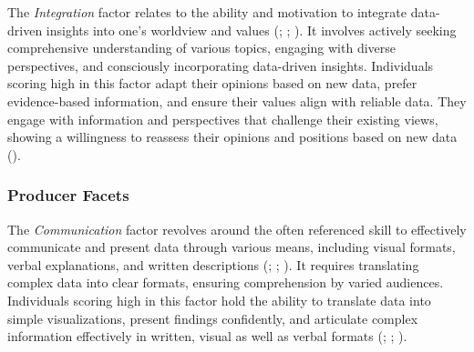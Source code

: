 \documentclass[
  12pt,
  a4paper,
  twoside]{article}
\begin{document}
The \emph{Integration} factor relates to the ability and motivation to integrate data-driven insights into one's worldview and values (; ; ). It involves actively seeking comprehensive understanding of various topics, engaging with diverse perspectives, and consciously incorporating data-driven insights. Individuals scoring high in this factor adapt their opinions based on new data, prefer evidence-based information, and ensure their values align with reliable data. They engage with information and perspectives that challenge their existing views, showing a willingness to reassess their opinions and positions based on new data ().

\subsubsection{Producer Facets}\label{producer-facets}

The \emph{Communication} factor revolves around the often referenced skill to effectively communicate and present data through various means, including visual formats, verbal explanations, and written descriptions (; ; ).
It requires translating complex data into clear formats, ensuring comprehension by varied audiences. Individuals scoring high in this factor hold the ability to translate data into simple visualizations, present findings confidently, and articulate complex information effectively in written, visual as well as verbal formats (; ; ).
\end{document}
